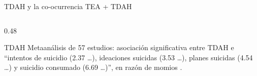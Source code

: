 \begin{frame}{TDAH y la co-ocurrencia TEA + TDAH}
  \begin{columns}[T,onlytextwidth]
    \begin{column}{0.48\textwidth}
      \begin{block}{TDAH}
        \scriptsize
        Metaanálisis de 57 estudios: asociación significativa entre TDAH e
        \enquote{intentos de suicidio (2.37 \ldots), ideaciones suicidas
        (3.53 \ldots), planes suicidas (4.54 \ldots) y suicidio consumado
        (6.69 \ldots)}, en razón de momios \citep{septier2019}.


\end{block}
\end{column}
\end{columns}
\end{frame}
